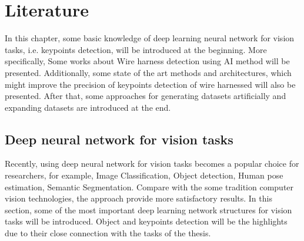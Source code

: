 \chapter{Literature}
    In this chapter, some basic knowledge of deep learning neural network for vision tasks, i.e. keypoints detection, will be introduced at the beginning. 
    More specifically, Some works about Wire harness detection using AI method will be presented. Additionally, some state of the art methods and architectures, 
    which might improve the precision of keypoints detection of wire harnessed will also be presented. After that, some approaches for generating datasets 
    artificially and expanding datasets are introduced at the end.
\section{Deep neural network for vision tasks}
    Recently, using deep neural network for vision tasks becomes a popular choice for researchers, for example, Image Classification\cite{8016501}, 
    Object detection\cite{10028728}, Human pose estimation\cite{Sun_2019_CVPR}, Semantic Segmentation\cite{HAO2020302}. Compare with the some 
    tradition computer vision technologies, the approach provide more satisfactory results\cite{voulodimos2018deep}. 
    In this section, some of the most important deep learning network structures for vision tasks will be introduced. Object and keypoints
    detection will be the highlights due to their close connection with the tasks of the thesis.\\
